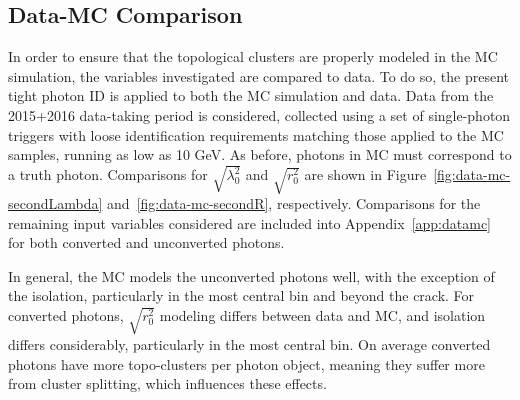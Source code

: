 \subsection{Data-MC Comparison}\label{ssec:yid-datamc}
In order to ensure that the topological clusters are properly modeled in the \gls{MC} simulation, the variables investigated are compared to data. To do so, the present tight photon ID is applied to both the \gls{MC} simulation and data. Data from the 2015+2016 data-taking period is considered, collected using a set of single-photon triggers with loose identification requirements matching those applied to the \gls{MC} samples, running as low as 10 GeV. As before, photons in \gls{MC} must correspond to a truth photon. Comparisons for $\sqrt{\lambda_{0}^2}$ and $\sqrt{r_{0}^2}$ are shown in Figure~\ref{fig:data-mc-secondLambda} and~\ref{fig:data-mc-secondR}, respectively. Comparisons for the remaining input variables considered are included into Appendix~\ref{app:datamc} for both converted and unconverted photons.

In general, the \gls{MC} models the unconverted photons well, with the exception of the isolation, particularly in the most central bin and beyond the crack. For converted photons, $\sqrt{r_{0}^2}$ modeling differs between data and \gls{MC}, and isolation differs considerably, particularly in the most central bin. On average converted photons have more topo-clusters per photon object, meaning they suffer more from cluster splitting, which influences these effects.


